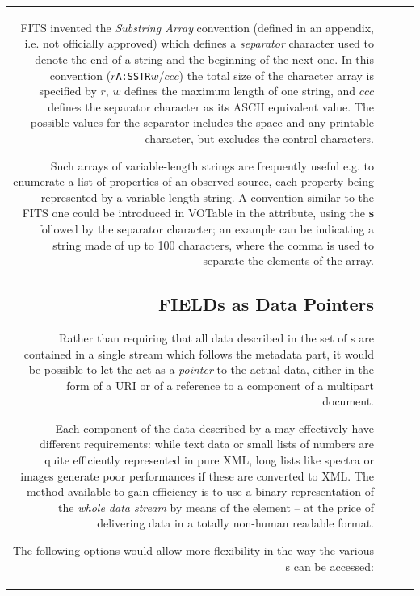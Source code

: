 \begin{tabular}{RRCp{0.8\textwidth}}
\begin{center}
{FITS invented the {\em Substring Array} convention (defined in an appendix,
i.e. not officially approved) which defines a {\em separator} character
used to denote the end of a string and the beginning of the next one.
In this convention ($r${\tt A:SSTR}$w$/$ccc$) the total size of the character
array is specified by $r$, $w$ defines the maximum length of one string,
and $ccc$ defines the separator character as its ASCII equivalent value.
The possible values for the separator includes the space and any printable
character, but excludes the control characters.

Such arrays of variable-length strings are frequently useful e.g.
to enumerate a list of properties of an observed source, each property being
represented by a variable-length string.
A convention similar to the FITS one could be introduced in 
VOTable in the 
attribute, using the {\bf s} followed by the separator character;
an example can be 
indicating a string made of up to 100 characters, where the comma
is used to separate the elements of the array.

\subsection{FIELDs as Data Pointers}
\label{location}

Rather than requiring that all data described in the set of s
are contained in a single stream which follows the metadata part, 
it would be possible to let the  act as 
a {\em pointer} to the actual data, either in the form of a URI or of
a reference to a component of a multipart document.

Each component of the data described by a  may effectively
have different requirements: while text data or small lists of numbers
are quite efficiently represented in pure XML, long lists like spectra
or images generate poor performances if these are converted to XML.
The method available to gain efficiency is to use a
binary representation of the {\em whole data stream} by means of the
 element -- at the price of delivering data in a totally non-human
readable format.

The following options would allow more flexibility in the way the 
various s can be accessed:

}
\end{center}
\end{tabular}
